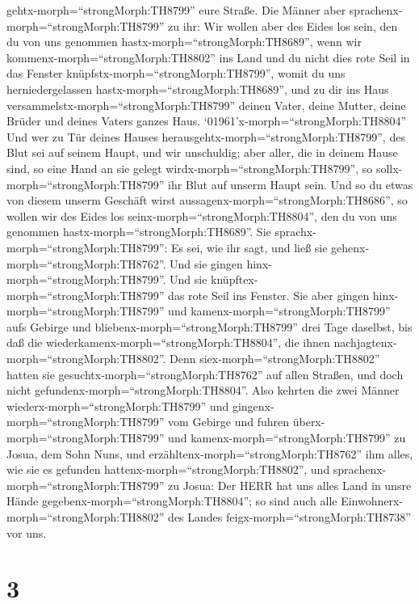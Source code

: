 gehtx-morph=``strongMorph:TH8799'' eure Straße.  Die Männer
aber sprachenx-morph=``strongMorph:TH8799'' zu ihr: Wir wollen aber des
Eides los sein, den du von uns genommen
hastx-morph=``strongMorph:TH8689'',  wenn wir
kommenx-morph=``strongMorph:TH8802'' ins Land und du nicht dies rote
Seil in das Fenster knüpfstx-morph=``strongMorph:TH8799'', womit du uns
herniedergelassen hastx-morph=``strongMorph:TH8689'', und zu dir ins
Haus versammelstx-morph=``strongMorph:TH8799'' deinen Vater, deine
Mutter, deine Brüder und deines Vaters ganzes Haus. 
`01961'\textbar x-morph=``strongMorph:TH8804'' Und wer zu Tür deines
Hauses herausgehtx-morph=``strongMorph:TH8799'', des Blut sei auf seinem
Haupt, und wir unschuldig; aber aller, die in deinem Hause sind, so eine
Hand an sie gelegt wirdx-morph=``strongMorph:TH8799'', so
sollx-morph=``strongMorph:TH8799'' ihr Blut auf unserm Haupt sein.
 Und so du etwas von diesem unserm Geschäft wirst
aussagenx-morph=``strongMorph:TH8686'', so wollen wir des Eides los
seinx-morph=``strongMorph:TH8804'', den du von uns genommen
hastx-morph=``strongMorph:TH8689''.  Sie
sprachx-morph=``strongMorph:TH8799'': Es sei, wie ihr sagt, und ließ sie
gehenx-morph=``strongMorph:TH8762''. Und sie gingen
hinx-morph=``strongMorph:TH8799''. Und sie
knüpftex-morph=``strongMorph:TH8799'' das rote Seil ins Fenster.
 Sie aber gingen hinx-morph=``strongMorph:TH8799'' und
kamenx-morph=``strongMorph:TH8799'' aufs Gebirge und
bliebenx-morph=``strongMorph:TH8799'' drei Tage daselbst, bis daß die
wiederkamenx-morph=``strongMorph:TH8804'', die ihnen
nachjagtenx-morph=``strongMorph:TH8802''. Denn
siex-morph=``strongMorph:TH8802'' hatten sie
gesuchtx-morph=``strongMorph:TH8762'' auf allen Straßen, und doch nicht
gefundenx-morph=``strongMorph:TH8804''.  Also kehrten die
zwei Männer wiederx-morph=``strongMorph:TH8799'' und
gingenx-morph=``strongMorph:TH8799'' vom Gebirge und fuhren
überx-morph=``strongMorph:TH8799'' und
kamenx-morph=``strongMorph:TH8799'' zu Josua, dem Sohn Nuns, und
erzähltenx-morph=``strongMorph:TH8762'' ihm alles, wie sie es gefunden
hattenx-morph=``strongMorph:TH8802'',  und
sprachenx-morph=``strongMorph:TH8799'' zu Josua: Der HERR hat uns alles
Land in unsre Hände gegebenx-morph=``strongMorph:TH8804''; so sind auch
alle Einwohnerx-morph=``strongMorph:TH8802'' des Landes
feigx-morph=``strongMorph:TH8738'' vor uns.

\hypertarget{section-2}{%
\section{3}\label{section-2}}

